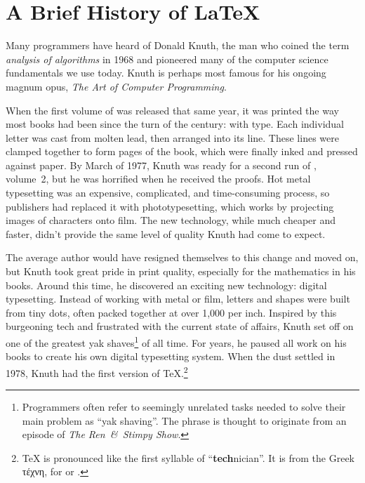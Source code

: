 \chapter{A Brief History of \texorpdfstring{\LaTeX}{LaTeX}}
\label{history}

Many programmers have heard of Donald Knuth,
the man who coined the term \emph{analysis of algorithms} in 1968
and pioneered many of the computer science fundamentals we use today.
Knuth is perhaps most famous for his ongoing magnum opus,
\textit{The Art of Computer Programming}.

When the first volume of  was released that same year,
it was printed the way most books had been since the turn of the century:
with  type.
Each individual letter was cast from molten lead,
then arranged into its line.
These lines were clamped together to form pages of the book,
which were finally inked and pressed against paper.
By March of 1977, Knuth was ready for a second run of , volume~2,
but he was horrified when he received the proofs.
Hot metal typesetting was an expensive, complicated, and time-consuming process,
so publishers had replaced it with phototypesetting,
which works by projecting images of characters onto film.
The new technology, while much cheaper and faster,
didn't provide the same level of quality Knuth had come to
expect.\punckern{}

The average author would have resigned themselves to this change and moved on,
but Knuth took great pride in print quality,
especially for the mathematics in his books.
Around this time, he discovered an exciting new technology:
digital typesetting.
Instead of working with metal or film,
letters and shapes were built from tiny dots,
often packed together at over 1,000 per inch.
Inspired by this burgeoning tech and frustrated with the current state of affairs,
Knuth set off on one of the greatest yak shaves\footnote{Programmers
often refer to seemingly unrelated tasks needed to solve their main problem
as ``yak shaving''\quotekern. The phrase is thought to originate from an episode
of \textit{The Ren~\&~Stimpy Show}.}
of all time.
For years, he paused all work on his books to create his own
digital typesetting system.
When the dust settled in 1978, Knuth had the first version of
\TeX.\punckern\footnote{\TeX{} is pronounced like the first syllable of
``\textbf{tech}nician''\quotekern. It is from the Greek
{τέχνη},
for  or .}

